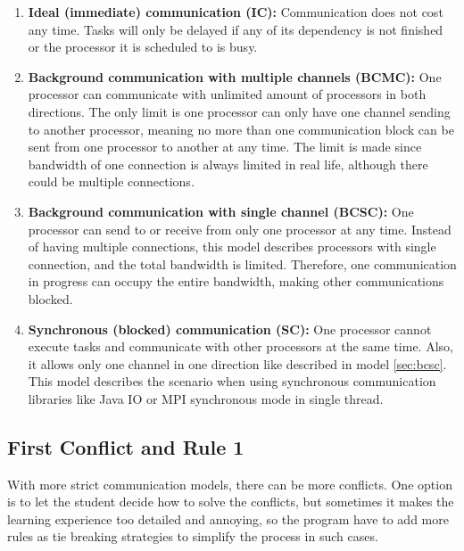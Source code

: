 \documentclass[msc,deptreport, cs]{infthesis}
\begin{document}
\begin{enumerate}
  \item \textbf{Ideal (immediate) communication (IC):} Communication does not cost any time. Tasks will only be delayed if any of its dependency is not finished or the processor it is scheduled to is busy.
  \item \textbf{Background communication with multiple channels (BCMC):} One processor can communicate with unlimited amount of processors in both directions. The only limit is one processor can only have one channel sending to another processor, meaning no more than one communication block can be sent from one processor to another at any time. The limit is made since bandwidth of one connection is always limited in real life, although there could be multiple connections.
  \item \label{sec:bcsc} \textbf{Background communication with single channel (BCSC):} One processor can send to or receive from only one processor at any time. Instead of having multiple connections, this model describes processors with single connection, and the total bandwidth is limited. Therefore, one communication in progress can occupy the entire bandwidth, making other communications blocked.
  \item \textbf{Synchronous (blocked) communication (SC):} One processor cannot execute tasks and communicate with other processors at the same time. Also, it allows only one channel in one direction like described in model \ref{sec:bcsc}. This model describes the scenario when using synchronous communication libraries like Java IO or MPI synchronous mode in single thread.
\end{enumerate}

\subsection{First Conflict and Rule 1}

With more strict communication models, there can be more conflicts. One option is to let the student decide how to solve the conflicts, but sometimes it makes the learning experience too detailed and annoying, so the program have to add more rules as tie breaking strategies to simplify the process in such cases.
\end{document}
